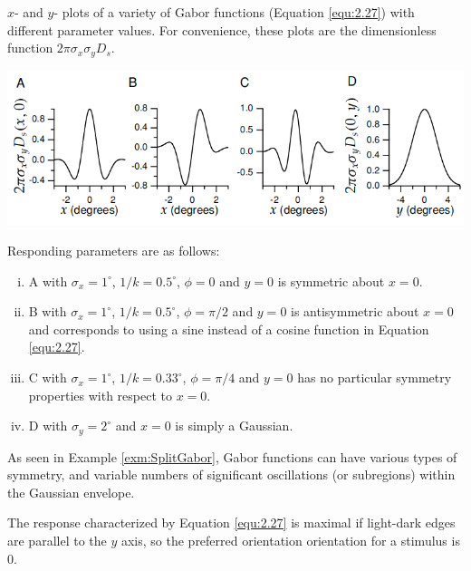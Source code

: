 \begin{exm}
  \label{exm:SplitGabor}
  $x$- and $y$- plots of a variety of Gabor functions (Equation \ref{equ:2.27}) with different parameter values. For convenience, these plots are the dimensionless function $2\pi\sigma_x\sigma_yD_s$.
  \begin{center}
    \includegraphics[scale=0.33]{./png/GaborSplitExm}
  \end{center}
  Responding parameters are as follows:
  \begin{enumerate}[(i)]
  \item A with $\sigma_x = 1^{\circ}$, $1/k = 0.5^{\circ}$, $\phi = 0$ and $y = 0$ is symmetric about $x = 0$.
  \item B with $\sigma_x = 1^{\circ}$, $1/k = 0.5^{\circ}$, $\phi = \pi/2$ and $y = 0$ is antisymmetric about $x = 0$ and corresponds to using a sine instead of a cosine function in Equation \ref{equ:2.27}.
  \item C with $\sigma_x = 1^{\circ}$, $1/k = 0.33^{\circ}$, $\phi = \pi/4$ and $y = 0$ has no particular symmetry properties with respect to $x = 0$.
  \item D with $\sigma_y = 2^{\circ}$ and $x = 0$ is simply a Gaussian.
  \end{enumerate}
\end{exm}

\begin{rem}
  As seen in Example \ref{exm:SplitGabor}, Gabor functions can have various types of symmetry, and variable numbers of significant oscillations (or subregions) within the Gaussian envelope.
\end{rem}

\begin{rem}
  The response characterized by Equation \ref{equ:2.27} is maximal if light-dark edges are parallel to the $y$ axis, so the preferred orientation orientation for a stimulus is 0.
\end{rem}

